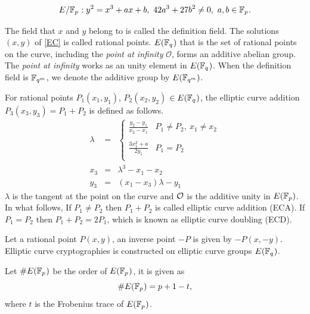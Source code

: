 \begin{equation}
E/{\mathbb{F}}_{p^{}}: y^2=x^3+ax+b,\ 42a^3+27b^2 \neq 0,\ a,b\in {\mathbb{F}}_{p^{}}. \label{EC}
\end{equation}

The field that $x$ and $y$ belong to is called the definition field. 
The solutions $(x,y)$ of \eqref{EC} is called rational points.
$E({\mathbb{F}}_{q^{}})$ that is the set of rational points on the curve, including the {\it point at infinity} $\mathcal{O}$, forms an additive abelian group. 
The {\it point at infinity} works as an unity element in $E({\mathbb{F}}_{q^{}})$.
When the definition field is ${\mathbb{F}}_{q^{m}}$, we denote the additive group by $E({\mathbb{F}}_{q^{m}})$.

For rational points $P_1(x_1,y_1)$, $P_2(x_2,y_2)$ $\in E({\mathbb{F}}_{q^{}})$, the elliptic curve addition $P_3(x_3,y_3)=P_1+P_2$ is defined as follows.
\begin{eqnarray*}
	\lambda &=& \left\{ \begin{array}{ll}
		{\displaystyle \frac{y_2-y_1}{x_2-x_1}} & P_1\neq P_2,\ x_1\neq x_2 \\
		& \\
		{\displaystyle \frac{3x_1^2+a}{2y_1}} & P_1=P_2 \\
		
	\end{array} \right.\\
	x_3 &=& \lambda^3-x_1-x_2\\
	y_3 &=& (x_1-x_3)\lambda-y_1
\end{eqnarray*} 
$\lambda$ is the tangent at the point on the curve and $\cal O$ is the additive unity in $E({\mathbb{F}}_{p})$.
In what follows, If $P_1 \neq P_2$ then $P_1+P_2$ is called elliptic curve addition (ECA). 
If $P_1=P_2$ then $P_1+P_2=2P_1$, which is known as elliptic curve doubling (ECD). 

Let a rational point $P(x,y)$, an inverse point $-P$ is given by $-P(x, -y)$. 
Elliptic curve cryptographies is constructed on elliptic curve groups $E({\mathbb{F}}_{q^{}})$.



Let $\#E({\mathbb{F}}_{p^{}})$ be the order of $E({\mathbb{F}}_{p^{}})$, it is given as
\begin{equation}
\#E(\F{p}{})=p+1-t, %
\end{equation}
where $t$ is the Frobenius trace of $E({\mathbb{F}}_{p^{}})$. 

